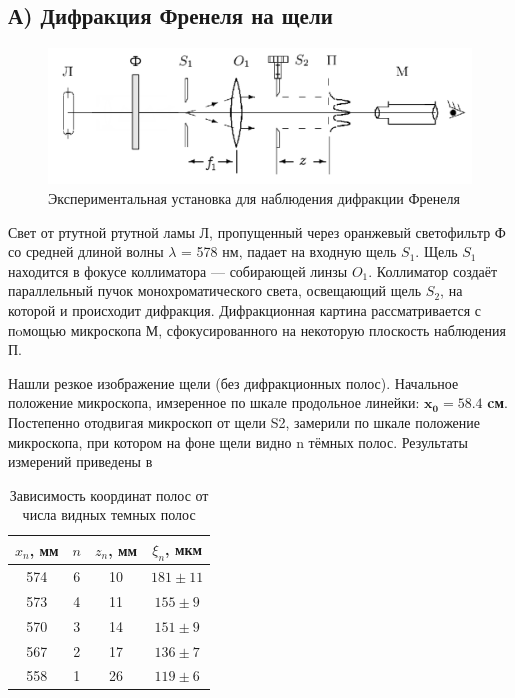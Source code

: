 \subsection*{А) Дифракция Френеля на щели}

\begin{figure}[h!]
\centering
\includegraphics[width=12cm]{images/setup.png}
\caption{Экспериментальная установка для наблюдения дифракции Френеля}\label{fig:setup}
\end{figure}

\indent
Свет от ртутной ртутной ламы Л, пропущенный через оранжевый светофильтр Ф со средней
длиной волны $\lambda$ = 578 нм, падает на входную щель $S_1$. Щель $S_1$ находится в фокусе
коллиматора — собирающей линзы $O_1$. Коллиматор создаёт параллельный пучок монохроматического света, освещающий щель $S_2$, на которой и происходит дифракция. Дифракционная картина рассматривается с пoмощью микроскопа М, сфокусированного на некоторую плоскость наблюдения П.

\indent
Нашли резкое изображение щели (без дифракционных полос). Начальное положение микроскопа, имзеренное по шкале продольное линейки: $\mathbf{x_0 = 58.4}$ \textbf{cм}.\\\indent
Постепенно отодвигая микроскоп от щели S2, замерили по шкале положение микроскопа, при котором на фоне щели видно n  тёмных
полос. Результаты измерений приведены в
\begin{table}[h]
    \centering
    \begin{tabular}{|c|c|c|c|}
        \hline
        \( x_n \), мм & \( n \) & \( z_n\), мм & \( \xi_n \), мкм \\\hline
        574    & 6    & 10    & $181 \pm 11$   \\ \hline
        573    & 4    & 11    & $155 \pm 9 $   \\ \hline
        570    & 3    & 14    & $151 \pm 9 $   \\ \hline
        567    & 2    & 17    & $136 \pm 7 $   \\ \hline
        558    & 1    & 26    & $119 \pm 6 $   \\ \hline
    \end{tabular}
    \caption{Зависимость координат полос от числа видных темных полос} \label{table:measurements_A}
\end{table}

